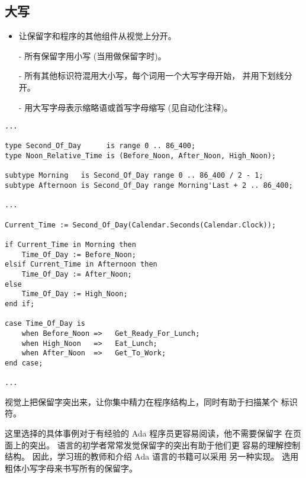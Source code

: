\subsection{大写}
\label{s:readability:cap}
\begin{itemize}
    \item 让保留字和程序的其他组件从视觉上分开。
\end{itemize}
\begin{blockindent}
\noindent
\begin{itemize}
    \item[-] 所有保留字用小写 (当用做保留字时)。
    \item[-] 所有其他标识符混用大小写，每个词用一个大写字母开始，
并用下划线分开。
    \item[-] 用大写字母表示缩略语或首写字母缩写 (见自动化注释)。
\end{itemize}
\end{blockindent}
\begin{blockindent}
\noindent
\begin{lstlisting}
...

type Second_Of_Day      is range 0 .. 86_400;
type Noon_Relative_Time is (Before_Noon, After_Noon, High_Noon);

subtype Morning   is Second_Of_Day range 0 .. 86_400 / 2 - 1;
subtype Afternoon is Second_Of_Day range Morning'Last + 2 .. 86_400;

...

Current_Time := Second_Of_Day(Calendar.Seconds(Calendar.Clock));

if Current_Time in Morning then
    Time_Of_Day := Before_Noon;
elsif Current_Time in Afternoon then
    Time_Of_Day := After_Noon;
else
    Time_Of_Day := High_Noon;
end if;

case Time_Of_Day is
    when Before_Noon =>   Get_Ready_For_Lunch;
    when High_Noon   =>   Eat_Lunch;
    when After_Noon  =>   Get_To_Work;
end case;

...
\end{lstlisting}
\end{blockindent}

\begin{blockindent}
视觉上把保留字突出来，让你集中精力在程序结构上，同时有助于扫描某个
标识符。

这里选择的具体事例对于有经验的 Ada 程序员更容易阅读，他不需要保留字
在页面上的突出。 语言的初学者常常发觉保留字的突出有助于他们更
容易的理解控制结构。 因此，学习班的教师和介绍 Ada 语言的书籍可以采用
另一种实现。 \cite{arm95} 选用粗体小写字母来书写所有的保留字。
\end{blockindent}


